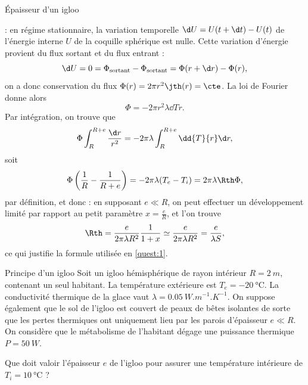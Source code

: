 \begin{exo}[PC][2][TD]{Épaisseur d'un igloo}
\begin{quest}
{: en régime stationnaire, la variation temporelle $\d U =  U(t+\d t)- U(t)$ de l'énergie interne $U$ de la coquille sphérique est nulle. Cette variation d'énergie provient du flux sortant et du flux entrant :
$$
\d U = 0 = \Phi_{\rm sortant} - \Phi_{\rm sortant} = \Phi(r+\d r) - \Phi(r),
$$
on a donc conservation du flux $\Phi(r) = 2\pi r^2 \jth(r) = \cte$. La loi de Fourier donne alors
$$
\Phi = -2\pi r^2\lambda \dd{T}{r}.
$$
Par intégration, on trouve que
$$ \Phi \int_R^{R+e} \frac{\d r}{r^2} =  -2\pi \lambda \int_R^{R+e} \dd{T}{r} \d r,$$ soit
$$
\Phi \left(\frac{1}{R}-\frac{1}{R+e}\right) = -2\pi \lambda (T_e-T_i) = 2\pi \lambda \Rth \Phi ,
$$
par définition, et donc
 : en supposant $e\ll R$, on peut effectuer un développement limité par rapport au petit paramètre $x=\frac{e}{R}$, et l'on trouve
$$
\Rth = \frac{e}{2\pi \lambda R^2} \frac{1}{1+x} \simeq \frac{e}{2\pi \lambda R^2} = \frac{e}{\lambda S},
$$
ce qui justifie la formule utilisée en \ref{quest:1}.
}
\end{quest}
\end{exo}


\begin{exo}[PC][1]{Principe d'un igloo}
Soit un igloo hémisphérique de rayon intérieur $R=\SI{2}{m}$, contenant un seul habitant. La température extérieure est $T_e = \SI{-20}{\celsius}$. La conductivité thermique de la glace vaut $\lambda=\SI{0,05}{W.m^{-1}.K^{-1}}$.
On suppose également que le sol de l'igloo est couvert de peaux de bêtes isolantes de sorte que les pertes thermiques ont uniquement lieu par les parois d'épaisseur $e \ll R$. On considère que le métabolisme de l'habitant dégage une puissance thermique $P=\SI{50}{W}$.


Que doit valoir l'épaisseur $e$ de l'igloo pour assurer une température intérieure de $T_i=\SI{10}{\celsius}$ ?
\end{exo}

